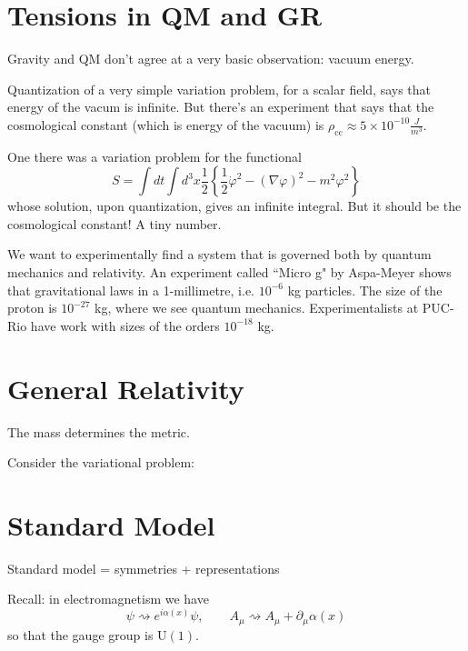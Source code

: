 \section{Tensions in QM and GR}
\label{section-tensions}

Gravity and QM don't agree at a very basic observation: vacuum energy.

Quantization of a very simple variation problem, for a scalar field, says that
energy of the vacum is infinite. But there's an experiment that says that the
cosmological constant (which is energy of the vacuum) is
 $\rho_{\operatorname{cc}}\approx 5 \times 10^{-10}\frac{J}{m^3}$.

One there was a variation problem for the functional
$$
S=\int dt \int d^3x \frac{1}{2}\left\{ \frac{1}{2}\dot\varphi^2-(\nabla \varphi)^2-m^2\varphi^2\right\} 
$$
whose solution, upon quantization, gives an infinite integral. But it should be
the cosmological constant! A tiny number.

We want to experimentally find a system that is governed both by quantum
mechanics and relativity. An experiment called ``Micro g" by Aspa-Meyer shows
that gravitational laws in a 1-millimetre, i.e. $10^{-6}$ kg particles. The size
of the proton is $10^{-27}$ kg, where we see quantum mechanics. Experimentalists
at PUC-Rio have work with sizes of the orders $10^{-18}$ kg.

\section{General Relativity}
\label{section-general-relativity}
\begin{slogan}
The mass determines the metric.
\end{slogan}
Consider the variational problem:

\section{Standard Model}
\label{section-standard-model}

\begin{slogan}
Standard model = symmetries + representations
\end{slogan}

Recall: in electromagnetism we have
$$
\psi\rightsquigarrow e^{i\alpha(x)}\psi,\qquad 
A_\mu\rightsquigarrow A_\mu+\partial_\mu\alpha(x)
$$
so that the gauge group is $\text{U}(1)$.

